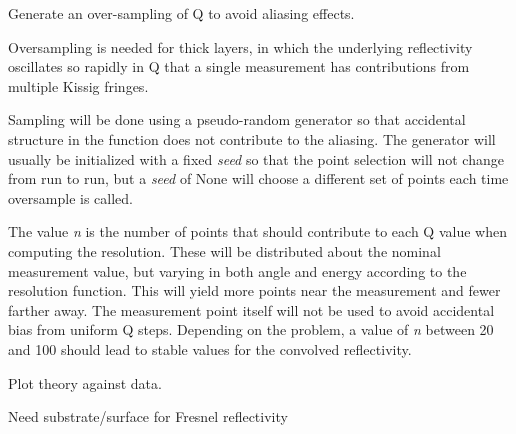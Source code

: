 \documentclass[letterpaper,10pt,english]{sphinxmanual}
\begin{document}
\begin{fulllineitems}
\begin{fulllineitems}
\label{api/probe:refl1d.probe.XrayProbe.oversample}
Generate an over-sampling of Q to avoid aliasing effects.

Oversampling is needed for thick layers, in which the underlying
reflectivity oscillates so rapidly in Q that a single measurement
has contributions from multiple Kissig fringes.

Sampling will be done using a pseudo-random generator so that
accidental structure in the function does not contribute to the
aliasing.  The generator will usually be initialized with a fixed
\emph{seed} so that the point selection will not change from run to run,
but a \emph{seed} of None will choose a different set of points each time
oversample is called.

The value \emph{n} is the number of points that should contribute to
each Q value when computing the resolution.   These will be
distributed about the nominal measurement value, but varying in
both angle and energy according to the resolution function.  This
will yield more points near the measurement and fewer farther away.
The measurement point itself will not be used to avoid accidental
bias from uniform Q steps.  Depending on the problem, a value of
\emph{n} between 20 and 100 should lead to stable values for the convolved
reflectivity.

\end{fulllineitems}


\begin{fulllineitems}
\label{api/probe:refl1d.probe.XrayProbe.parameters}
\end{fulllineitems}


\begin{fulllineitems}
\label{api/probe:refl1d.probe.XrayProbe.plot}
Plot theory against data.

Need substrate/surface for Fresnel reflectivity

\end{fulllineitems}



\end{fulllineitems}
\end{document}
